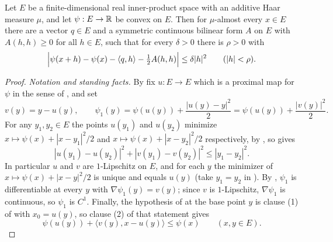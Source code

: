 \begin{theorem}
Let $E$ be a finite-dimensional real inner-product space with an additive Haar
measure $\mu$, and let $\psi:E\to\mathbb{R}$ be convex on $E$. Then for $\mu$-almost
every $x\in E$ there are a vector $q\in E$ and a symmetric continuous bilinear
form $A$ on $E$ with $A(h,h)\ge0$ for all $h\in E$, such that for every
$\delta>0$ there is $\rho>0$ with
\[
  \Bigl|\psi(x+h)-\psi(x)-\langle q,h\rangle-\tfrac12A(h,h)\Bigr|
    \le\delta|h|^2\qquad(|h|<\rho).
\]
\end{theorem}
\begin{proof}
\emph{Notation and standing facts.}
By  fix $u:E\to E$ which is a proximal map for $\psi$
in the sense of , and set
\[
  v(y)=y-u(y),\qquad \psi_1(y)=\psi(u(y))+\frac{|u(y)-y|^2}{2}
   =\psi(u(y))+\frac{|v(y)|^2}{2}.
\]
For any $y_1,y_2\in E$ the points $u(y_1)$ and $u(y_2)$ minimize
$x\mapsto\psi(x)+|x-y_1|^2/2$ and $x\mapsto\psi(x)+|x-y_2|^2/2$ respectively, by
, so  gives
\begin{equation}\label{eq:csa-firm}
  |u(y_1)-u(y_2)|^2+|v(y_1)-v(y_2)|^2\le|y_1-y_2|^2 .
\end{equation}
In particular $u$ and $v$ are $1$-Lipschitz on $E$, and for each $y$ the
minimizer of $x\mapsto\psi(x)+|x-y|^2/2$ is unique and equals $u(y)$ (take
$y_1=y_2$ in ). By
, $\psi_1$ is differentiable at every $y$ with
$\nabla\psi_1(y)=v(y)$; since $v$ is $1$-Lipschitz, $\nabla\psi_1$ is
continuous, so $\psi_1$ is $C^1$. Finally, the hypothesis of
 at the base point $y$ is clause (1) of
 with $x_0=u(y)$, so clause (2) of that statement
gives
\begin{equation}\label{eq:csa-subgrad}
  \psi(u(y))+\langle v(y),x-u(y)\rangle\le\psi(x)\qquad(x,y\in E).
\end{equation}


\end{proof}
